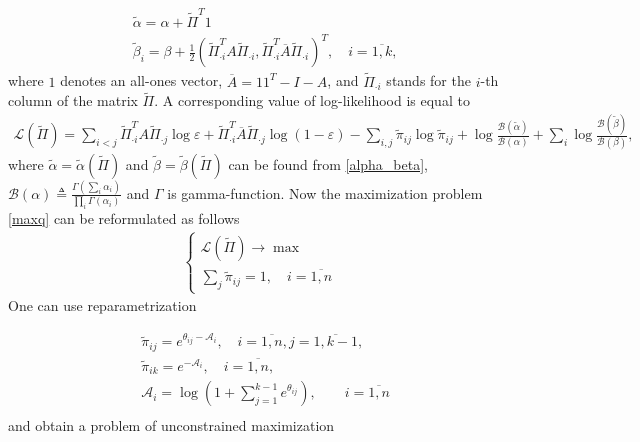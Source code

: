 \begin{equation}
    \begin{aligned}
    \label{alpha_beta}
    & \tilde\alpha = \alpha + \tilde\Pi^T 1 \\
    & \tilde \beta_i = \beta + \frac12 \left( \tilde\Pi_{\cdot i}^T A \tilde\Pi_{\cdot i}, \tilde\Pi_{\cdot i}^T \overline A \tilde\Pi_{\cdot i} \right)^T, \quad i = \overline{1, k},
    \end{aligned}
\end{equation}
where $1$ denotes an all-ones vector, $\overline A = 11^T - I - A$, and $\tilde\Pi_{\cdot i}$ stands for the $i$\/-th column of the matrix $\tilde\Pi$.
A corresponding value of log-likelihood is equal to
\begin{equation}
    \begin{aligned}
    \label{L}
    \mathcal L(\tilde\Pi) = \sum\limits_{i < j}  \tilde\Pi_{\cdot i}^T A \tilde\Pi_{\cdot j} \log\varepsilon + \tilde\Pi_{\cdot i}^T \overline A \tilde\Pi_{\cdot j}\log(1 - \varepsilon) - \sum\limits_{i,j} \tilde\pi_{ij} \log\tilde\pi_{ij} + \log\frac{\mathcal B(\tilde\alpha)}{\mathcal B(\alpha)} + \sum\limits_i \log\frac{\mathcal B(\tilde\beta)}{\mathcal B(\beta)},
    \end{aligned}
\end{equation}
where $\tilde\alpha = \tilde\alpha(\tilde\Pi)$ and $\tilde\beta = \tilde\beta(\tilde\Pi)$ can be found from \ref{alpha_beta}, $\mathcal B(\alpha) \triangleq \frac{\Gamma\left( \sum\limits_i \alpha_i \right)}{\prod\limits_i \Gamma(\alpha_i)}$ and $\Gamma$ is gamma-function.
Now the maximization problem \ref{maxq} can be reformulated as follows
\begin{equation}
    \begin{aligned}
    \begin{cases}
        \mathcal L(\tilde\Pi) \longrightarrow \max \\
        \sum\limits_{j} \tilde\pi_{ij} = 1, \quad i = \overline{1,n}
    \end{cases}
    \end{aligned}
\end{equation}
One can use reparametrization

\begin{equation}
    \begin{aligned}
    \label{pi}
    & \tilde\pi_{ij} = e^{\theta_{ij} - \mathcal A_i}, \quad i = \overline{1, n}, j = \overline{1, k-1}, \\
    & \tilde\pi_{ik} = e^{-\mathcal A_i}, \quad i = \overline{1, n}, \\
    & \mathcal A_i = \log \left( 1 + \sum\limits_{j=1}^{k-1} e^{\theta_{ij}} \right), \quad \quad i = \overline{1, n} \\
    \end{aligned}
\end{equation}
and obtain a problem of unconstrained maximization

